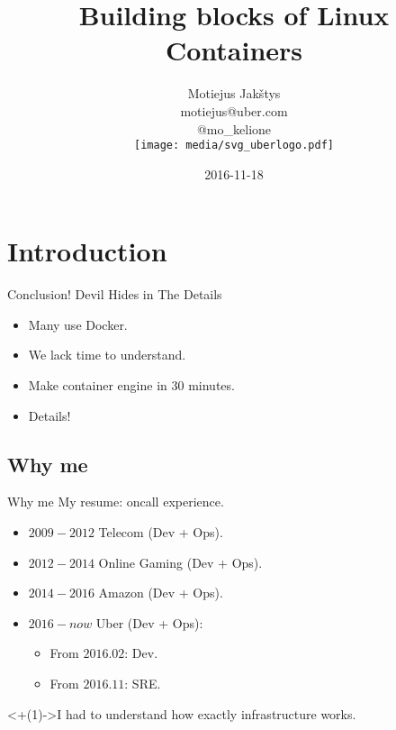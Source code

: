 \documentclass[14pt]{beamer}
\title{Building blocks of Linux Containers}
\author{Motiejus Jak\v{s}tys \\
    motiejus@uber.com \\
    @mo\_kelione \\
    \vspace{1em}
    \texttt{[image: media/svg\_uberlogo.pdf]}
}
\date{2016-11-18}
\begin{document}

\begin{frame}
\titlepage
\end{frame}

\section{Introduction}

\begin{frame}{Conclusion!}
    \pause
    Devil Hides in The Details
    \begin{itemize}[<+->]
        \item Many use Docker.
        \item We lack time to understand.
        \item Make container engine in 30 minutes.
        \item Details! 
    \end{itemize}
\end{frame}

\subsection{Why me}
\begin{frame}{Why me}
    My resume: {\tiny oncall experience.}
    \begin{itemize}
        \item $2009-2012$ Telecom (Dev + Ops).
        \item $2012-2014$ Online Gaming (Dev + Ops).
        \item $2014-2016$ Amazon (Dev + Ops).
        \item $2016-now$ Uber (Dev + Ops):
            \begin{itemize}
                \item From $2016.02$: Dev.
                \item From $2016.11$: SRE.
            \end{itemize}
    \end{itemize}
    \onslide<+(1)->{I had to understand how exactly infrastructure works.}
\end{frame}
\end{document}
